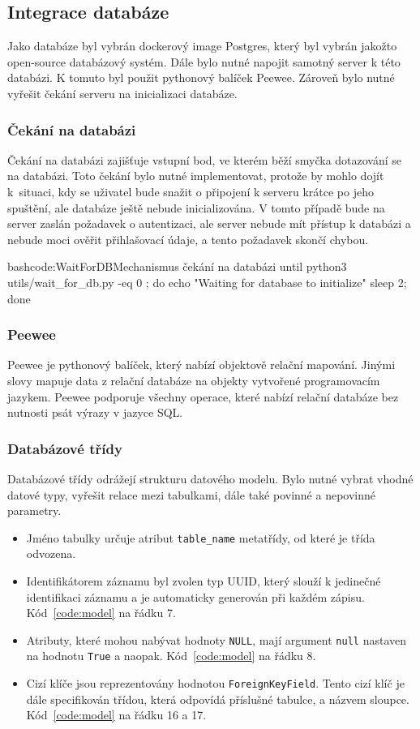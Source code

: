 \documentclass[
  glossaries,
]{kidiplom}
\begin{document}
\subsection{Integrace databáze}
Jako databáze byl vybrán dockerový image Postgres, který byl vybrán jakožto open-source databázový systém. Dále bylo nutné napojit samotný server k této databázi. K tomuto byl použit pythonový balíček Peewee. Zároveň bylo nutné vyřešit čekání serveru na inicializaci databáze.

\subsubsection{Čekání na databázi}
Čekání na databázi zajišťuje vstupní bod, ve kterém běží smyčka dotazování se na databázi. Toto čekání bylo nutné implementovat, protože by mohlo dojít k~situaci, kdy se uživatel bude snažit o připojení k serveru krátce po jeho spuštění, ale databáze ještě nebude inicializována. V tomto případě bude na server zaslán požadavek o autentizaci, ale server nebude mít přístup k databázi a nebude moci ověřit přihlašovací údaje, a tento požadavek skončí chybou.
\begin{kicode}{bash}{code:WaitForDB}{Mechanismus čekání na databázi}
until python3 utils/wait_for_db.py -eq 0 ; do
    echo "Waiting for database to initialize"
    sleep 2;
done
\end{kicode}

\subsubsection{Peewee}
Peewee je pythonový balíček, který nabízí objektově relační mapování. Jinými slovy mapuje data z relační databáze na objekty vytvořené programovacím jazykem. Peewee podporuje všechny operace, které nabízí relační databáze bez nutnosti psát výrazy v jazyce SQL.

\subsubsection{Databázové třídy}
Databázové třídy odrážejí strukturu datového modelu. Bylo nutné vybrat vhodné datové typy, vyřešit relace mezi tabulkami, dále také povinné a nepovinné parametry.
\begin{itemize}
\item Jméno tabulky určuje atribut \texttt{table\_name} metatřídy, od které je třída odvozena.
\item Identifikátorem záznamu byl zvolen typ UUID, který slouží k jedinečné identifikaci záznamu a je automaticky generován při každém zápisu. Kód~\ref{code:model} na řádku 7.
\item Atributy, které mohou nabývat hodnoty \texttt{NULL}, mají argument \texttt{null} nastaven na hodnotu \texttt{True} a naopak. Kód~\ref{code:model} na řádku 8.
\item Cizí klíče jsou reprezentovány hodnotou \texttt{ForeignKeyField}. Tento cizí klíč je dále specifikován třídou, která odpovídá příslušné tabulce, a názvem sloupce. Kód~\ref{code:model} na řádku 16 a 17.
\end{itemize}
\end{document}
